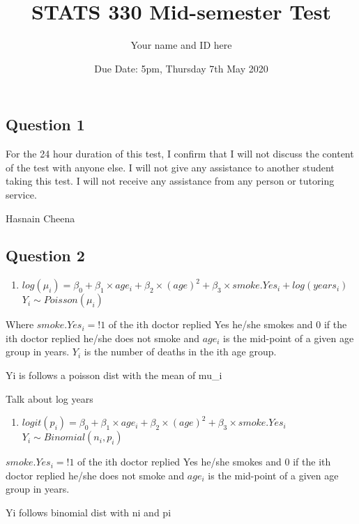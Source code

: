 \documentclass[
]{article}
\title{STATS 330 Mid-semester Test}
\author{Your name and ID here}
\date{Due Date: 5pm, Thursday 7th May 2020}
\providecommand{\tightlist}{%
  \setlength{\itemsep}{0pt}\setlength{\parskip}{0pt}}
\begin{document}
\maketitle

\hypertarget{question-1}{%
\subsection{Question 1}\label{question-1}}

For the 24 hour duration of this test, I confirm that I will not discuss
the content of the test with anyone else. I will not give any assistance
to another student taking this test. I will not receive any assistance
from any person or tutoring service.

Hasnain Cheena

\hypertarget{question-2}{%
\subsection{Question 2}\label{question-2}}

\begin{enumerate}
\def\labelenumi{\alph{enumi})}
\tightlist
\item
  \(log(\mu_i) = \beta_0 + \beta_1 \times age_i + \beta_2 \times (age)^2 + \beta_3 \times smoke.Yes_i + log(years_i)\)
  \(Y_i \sim Poisson(\mu_i)\)
\end{enumerate}

Where \(smoke.Yes_i = !1\) of the ith doctor replied Yes he/she smokes
and \(0\) if the ith doctor replied he/she does not smoke and \(age_i\)
is the mid-point of a given age group in years. \(Y_i\) is the number of
deaths in the ith age group.

Yi is follows a poisson dist with the mean of mu\_i

Talk about log years

\begin{enumerate}
\def\labelenumi{\alph{enumi})}
\setcounter{enumi}{1}
\tightlist
\item
  \(logit(p_i) = \beta_0 + \beta_1 \times age_i + \beta_2 \times (age)^2 + \beta_3 \times smoke.Yes_i\)
  \(Y_i \sim Binomial(n_i, p_i)\)
\end{enumerate}

\(smoke.Yes_i = !1\) of the ith doctor replied Yes he/she smokes and
\(0\) if the ith doctor replied he/she does not smoke and \(age_i\) is
the mid-point of a given age group in years.

Yi follows binomial dist with ni and pi
\end{document}
